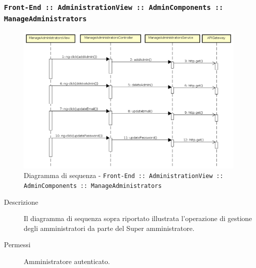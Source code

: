 \documentclass[../DefinizioneDiProdotto_v3.0.0.tex]{subfiles}
\begin{document}
\newpage
\subsubsection{\texttt{Front-End :: AdministrationView :: AdminComponents :: ManageAdministrators}}
\begin{figure}[!h]
	\centering
	\includegraphics[width=\textwidth]{DiagrammiSequenza/Front-End/AdministrationView/ManageAdministrators.png}
	\caption{Diagramma di sequenza - \texttt{Front-End :: AdministrationView :: AdminComponents :: ManageAdministrators }}
\end{figure}
\begin{description}
	\item [Descrizione] Il diagramma di sequenza sopra riportato illustrata l'operazione di gestione degli amministratori da parte del Super amministratore.
	\item [Permessi] Amministratore autenticato.
\end{description}

\newpage
\end{document}
